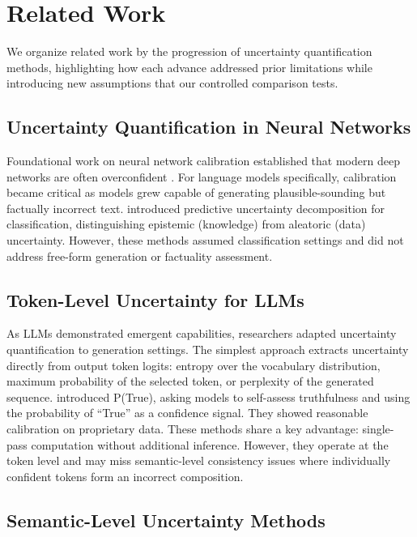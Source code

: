 \section{Related Work}
\label{sec:related}

We organize related work by the progression of uncertainty quantification methods, highlighting how each advance addressed prior limitations while introducing new assumptions that our controlled comparison tests.

\subsection{Uncertainty Quantification in Neural Networks}

Foundational work on neural network calibration established that modern deep networks are often overconfident \citep{guo2017calibration}. For language models specifically, calibration became critical as models grew capable of generating plausible-sounding but factually incorrect text. \citet{malinin2018predictive} introduced predictive uncertainty decomposition for classification, distinguishing epistemic (knowledge) from aleatoric (data) uncertainty. However, these methods assumed classification settings and did not address free-form generation or factuality assessment.

\subsection{Token-Level Uncertainty for LLMs}

As LLMs demonstrated emergent capabilities, researchers adapted uncertainty quantification to generation settings. The simplest approach extracts uncertainty directly from output token logits: entropy over the vocabulary distribution, maximum probability of the selected token, or perplexity of the generated sequence. \citet{kadavath2022language} introduced P(True), asking models to self-assess truthfulness and using the probability of ``True'' as a confidence signal. They showed reasonable calibration on proprietary data. These methods share a key advantage: single-pass computation without additional inference. However, they operate at the token level and may miss semantic-level consistency issues where individually confident tokens form an incorrect composition.

\subsection{Semantic-Level Uncertainty Methods}

